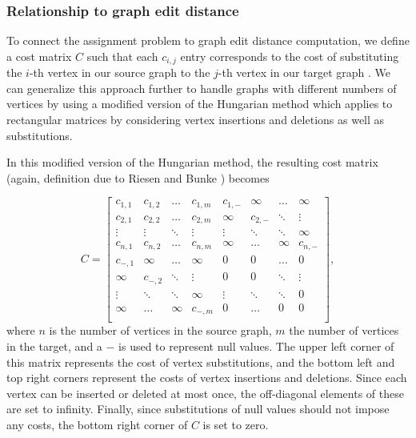 \documentclass[12pt]{thesis}
\theoremstyle{plain}
\theoremstyle{definition}
\theoremstyle{remark}
\begin{document}
\subsubsection{Relationship to graph edit distance}

To connect the assignment problem to graph edit distance computation, we define a cost matrix $C$ such that each $c_{i,j}$ entry corresponds to the cost of substituting the $i$-th vertex in our source graph to the $j$-th vertex in our target graph \cite{Riesen_2009}. We can generalize this approach further to handle graphs with different numbers of vertices by using a modified version of the Hungarian method which applies to rectangular matrices \cite{bourgeois1971extension} by considering vertex insertions and deletions as well as substitutions. 

In this modified version of the Hungarian method, the resulting cost matrix (again, definition due to Riesen and Bunke \cite{Riesen_2009}) becomes 

\[
C = \left[
\begin{array}{cccc|cccc}
c_{1,1} & c_{1,2} & \dots & c_{1,m}     &     c_{1,-} & \infty & \dots & \infty \\
c_{2,1} & c_{2,2} & \dots & c_{2,m}     &     \infty & c_{2,-} & \ddots & \vdots \\
\vdots & \vdots & \ddots & \vdots          &     \vdots & \ddots & \ddots & \infty \\ 
c_{n,1} & c_{n,2} & \dots & c_{n,m}     &     \infty & \dots & \infty & c_{n,-} \\ \hline

c_{-,1} & \infty & \dots & \infty             &     0 & 0 & \dots & 0 \\ 
\infty & c_{-,2} & \ddots & \vdots          &     0 & 0 & \ddots & \vdots \\ 
\vdots & \ddots & \ddots & \infty           &     \vdots & \ddots & \ddots & 0\\ 
\infty & \dots & \infty & c_{-,m}            &    0 & \dots & 0 & 0 \\ 
\end{array}
\right],
\]
where $n$ is the number of vertices in the source graph, $m$ the number of vertices in the target, and a $-$ is used to represent null values. The upper left corner of this matrix represents the cost of vertex substitutions, and the bottom left and top right corners represent the costs of vertex insertions and deletions. Since each vertex can be inserted or deleted at most once, the off-diagonal elements of these are set to infinity. Finally, since substitutions of null values should not impose any costs, the bottom right corner of $C$ is set to zero.
\end{document}
